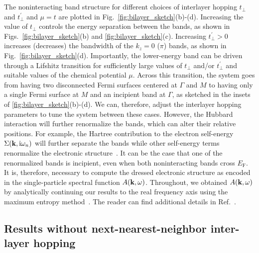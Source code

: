 \documentclass[prb,twocolumn,amsmath,amssymb,superscriptaddress,floatfix,nofootinbib]{revtex4-2}
\begin{document}
The noninteracting band structure for different choices of interlayer hopping $t^{\phantom\prime}_\perp$ and $t_\perp^\prime$ and $\mu = t$ are plotted in Fig.~\ref{fig:bilayer_sketch}(b)-(d). Increasing the value of $t_\perp$ controls the energy separation between the bands, as shown in Figs.~\ref{fig:bilayer_sketch}(b) and \ref{fig:bilayer_sketch}(c). Increasing $t_\perp^\prime > 0$ increases (decreases) the bandwidth of the $k_z = 0$ ($\pi$) bands, as shown in Fig.~\ref{fig:bilayer_sketch}(d). Importantly, the lower-energy band can be driven through a Lifshitz transition for sufficiently large values of $t^{\phantom\prime}_\perp$ and/or $t_\perp^\prime$ and suitable values of the chemical potential $\mu$. Across this transition, the system goes from having two disconnected Fermi surfaces centered at $\Gamma$ and $M$ to having only a single Fermi surface at $M$ and an incipient band at $\Gamma$, as sketched in the insets of \ref{fig:bilayer_sketch}(b)-(d). 
We can, therefore, adjust the interlayer hopping parameters to tune the system between these cases. 
However, the Hubbard interaction will further renormalize the bands, which can alter their relative positions. For example, the Hartree contribution to the electron self-energy $\Sigma({\bf k},\mathrm{i}\omega_n)$ will further separate the bands \cite{KurokiFlex2020, RademakerEnhanced2021} while other self-energy terms renormalize the electronic structure~\cite{KurokiFlex2020, RademakerEnhanced2021, Maier2019, PelliciariRIXS2020}. It can be the case that one of the renormalized bands is incipient, even when both noninteracting bands cross $E_\mathrm{F}$. It is, therefore, necessary to compute the dressed electronic structure as encoded in the single-particle spectral function $A({\bf k},\omega)$. Throughout, we obtained  $A({\bf k},\omega)$ by analytically continuing our results to the real frequency axis using the maximum entropy method~\cite{Gubernatis1991}. The reader can find additional details in Ref.~. 

\subsection{Results without next-nearest-neighbor inter-layer hopping}
\end{document}
